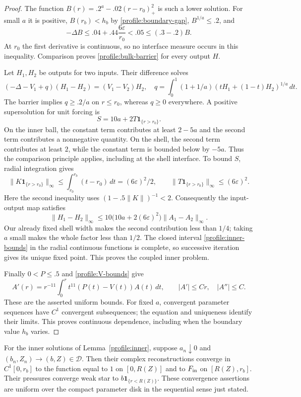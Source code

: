 \begin{proof}
The function
$B(r)=.2^a-.02(r-r_0)_+^2$ is such a lower solution.  For small $a$ it
is positive, $B(r_b)<h_b$ by \eqref{profile:boundary-gap},
$B^{1/a}\le.2$, and
\[
 -\Delta B\le .04+.44\frac{6\varepsilon}{r_0}<.05
       \le(.3-.2)B.
\]
At $r_0$ the first derivative is continuous, so no interface measure
occurs in this inequality.  Comparison proves
\eqref{profile:bulk-barrier} for every output $H$.

Let $H_1,H_2$ be outputs for two inputs.  Their difference solves
\[
 (-\Delta-V_1+q)(H_1-H_2)=(V_1-V_2)H_2,
 \quad
 q=\int_0^1(1+1/a)(tH_1+(1-t)H_2)^{1/a}\,dt.
\]
The barrier implies $q\ge.2/a$ on $r\le r_0$, whereas $q\ge0$
everywhere.  A positive supersolution for unit forcing is
\begin{equation}\label{profile:small-inverse}
 S=10a+2T\mathbf1_{\{r>r_0\}}.
\end{equation}
On the inner ball, the constant term contributes at least $2-5a$ and
the second term contributes a nonnegative quantity.  On the shell, the
second term contributes at least $2$, while the constant term is bounded
below by $-5a$.  Thus the comparison principle applies, including at
the shell interface.  To bound $S$, radial integration gives
\[
 \|K\mathbf1_{\{r>r_0\}}\|_\infty
 \le\int_{r_0}^{r_b}(t-r_0)\,dt=(6\varepsilon)^2/2,
 \qquad
 \|T\mathbf1_{\{r>r_0\}}\|_\infty\le(6\varepsilon)^2.
\]
Here the second inequality uses
$(1-.5\|K\|)^{-1}<2$.  Consequently the input-output map satisfies
\[
 \|H_1-H_2\|_\infty
 \le10\big(10a+2(6\varepsilon)^2\big)\|A_1-A_2\|_\infty.
\]
Our already fixed shell width makes the second contribution less than
$1/4$; taking $a$ small makes the whole factor less than $1/2$.
The closed interval \eqref{profile:inner-bounds} in the radial continuous
functions is complete, so successive iteration gives its unique fixed
point.  This proves the coupled inner problem.

Finally $0<P\le.5$ and \eqref{profile:V-bounds} give
\[
 A'(r)=r^{-11}\int_0^r t^{11}(P(t)-V(t))A(t)\,dt,
       \qquad |A'|\le Cr,\quad |A''|\le C.
\]
These are the asserted uniform bounds.  For fixed $a$, convergent
parameter sequences have $C^1$ convergent subsequences; the equation and
uniqueness identify their limits.  This proves continuous dependence,
including when the boundary value $h_b$ varies.
\end{proof}

\begin{lemma}\label{profile:core-limit}
For the inner solutions of Lemma~\ref{profile:inner}, suppose
$a_n\downarrow0$ and $(b_n,Z_n)\to(b,Z)\in\mathcal D$.  Then their
complex reconstructions converge in $C^1[0,r_b]$ to the function equal to
$1$ on $[0,R(Z)]$ and to $F_{\rm in}$ on $[R(Z),r_b]$.
Their pressures converge weak star to $b\mathbf1_{\{r<R(Z)\}}$.
These convergence assertions are uniform over the compact parameter disk
in the sequential sense just stated.
\end{lemma}

